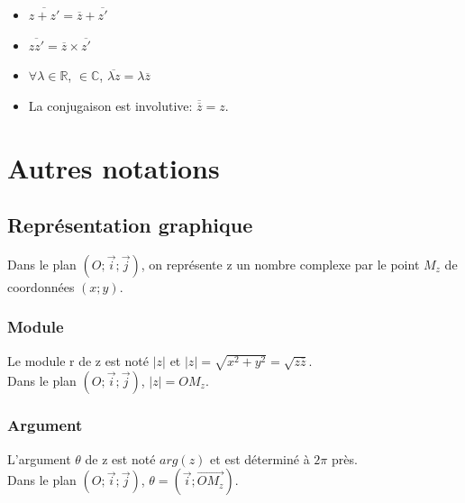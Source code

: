 \documentclass[a4paper,10pt]{book}
\newcommand{\R}{\mathbb{R}}
\newcommand{\C}{\mathbb{C}}
\begin{document}
\begin{itemize}\renewcommand{\labelitemi}{$\bullet$}
\item $\overline{z+z'}=\overline{z}+\overline{z'}$\\
\item $\overline{zz'}=\overline{z} \times \overline{z'}$\\
\item $\forall \lambda \in \R$, $ \in \C$, $\overline{\lambda z}=\lambda \overline{z}$ \\
\item La conjugaison est involutive: $\overline{\overline{z}}=z$.
\end{itemize}

\section{Autres notations}
\subsection{Représentation graphique}
Dans le plan $(O;\vec{i};\vec{j})$, on représente z un nombre complexe par le point $M_{z}$ de coordonnées $(x;y)$.

\subsubsection{Module}
Le module r de z est noté $|z|$ et $|z|=\sqrt{x^{2}+y^{2}}=\sqrt{z \overline{z}}$.\\
Dans le plan $(O;\vec{i};\vec{j})$, $|z|=OM_{z}$.\\

\subsubsection{Argument}
L'argument $\theta$ de z est noté $arg(z)$ et est déterminé à $2\pi$ près.\\
Dans le plan $(O;\vec{i};\vec{j})$, $\theta =(\vec{i};\overset{\longrightarrow}{OM_{z}})$.\\
\end{document}
